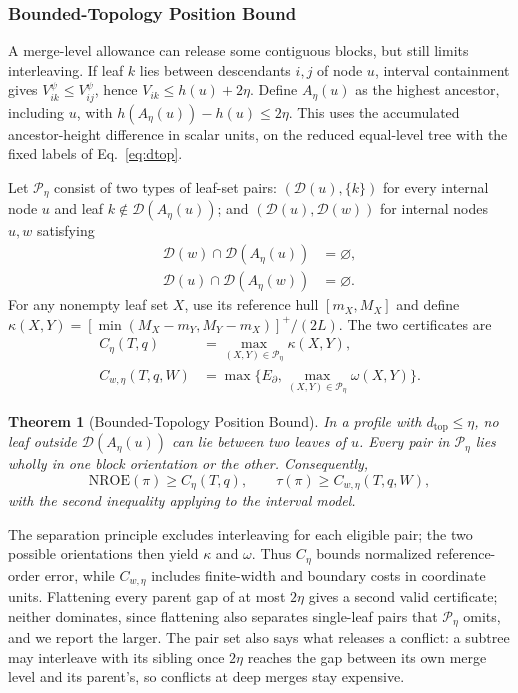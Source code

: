 \documentclass[review]{vgtc}
\newtheorem{theorem}{Theorem}
\newcommand{\dtop}{d_{\mathrm{top}}}
\newcommand{\nroe}{\mathrm{NROE}}
\begin{document}


\subsubsection{Bounded-Topology Position Bound}
A merge-level allowance can release some contiguous blocks, but still limits interleaving. If leaf $k$ lies between descendants $i,j$ of node $u$, interval containment gives $V_{ik}^{\psi}\le V_{ij}^{\psi}$, hence $V_{ik}\le h(u)+2\eta$. Define $A_\eta(u)$ as the highest ancestor, including $u$, with $h(A_\eta(u))-h(u)\le2\eta$. This uses the accumulated ancestor-height difference in scalar units, on the reduced equal-level tree with the fixed labels of Eq.~\ref{eq:dtop}.

Let $\mathcal{P}_\eta$ consist of two types of leaf-set pairs: $(\mathcal{D}(u),\{k\})$ for every internal node $u$ and leaf $k\notin\mathcal{D}(A_\eta(u))$; and $(\mathcal{D}(u),\mathcal{D}(w))$ for internal nodes $u,w$ satisfying
\begin{equation}\label{eq:separatedpairs}
\begin{aligned}
 \mathcal{D}(w)\cap\mathcal{D}(A_\eta(u))&=\varnothing,\\
 \mathcal{D}(u)\cap\mathcal{D}(A_\eta(w))&=\varnothing.
\end{aligned}
\end{equation}
For any nonempty leaf set $X$, use its reference hull $[m_X,M_X]$ and define $\kappa(X,Y)=[\min(M_X-m_Y,M_Y-m_X)]^+/(2L)$. The two certificates are
\begin{equation}\label{eq:chaindef}
\begin{aligned}
 C_\eta(T,q)&=\max_{(X,Y)\in\mathcal{P}_\eta}\kappa(X,Y),\\
 C_{w,\eta}(T,q,W)&=\max\{E_\partial,\max_{(X,Y)\in\mathcal{P}_\eta}\omega(X,Y)\}.
\end{aligned}
\end{equation}
\begin{theorem}[Bounded-Topology Position Bound]\label{thm:chain}
In a profile with $\dtop\le\eta$, no leaf outside $\mathcal{D}(A_\eta(u))$ can lie between two leaves of $u$. Every pair in $\mathcal{P}_\eta$ lies wholly in one block orientation or the other. Consequently,
\begin{equation}\label{eq:chainbounds}
 \nroe(\pi)\ge C_\eta(T,q),\qquad
 \tau(\pi)\ge C_{w,\eta}(T,q,W),
\end{equation}
with the second inequality applying to the interval model.
\end{theorem}
The separation principle excludes interleaving for each eligible pair; the two possible orientations then yield $\kappa$ and $\omega$. Thus $C_\eta$ bounds normalized reference-order error, while $C_{w,\eta}$ includes finite-width and boundary costs in coordinate units. Flattening every parent gap of at most $2\eta$ gives a second valid certificate; neither dominates, since flattening also separates single-leaf pairs that $\mathcal{P}_\eta$ omits, and we report the larger. The pair set also says what releases a conflict: a subtree may interleave with its sibling once $2\eta$ reaches the gap between its own merge level and its parent's, so conflicts at deep merges stay expensive.
\end{document}
